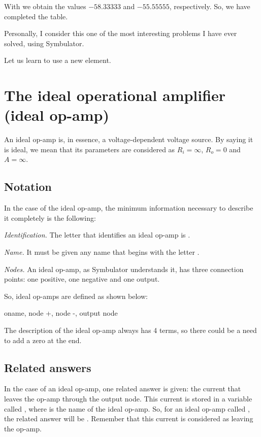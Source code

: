 With  we obtain the values $-58.33333$ and $-55.55555$,
respectively. So, we have completed the table.

Personally, I consider this one of the most interesting problems I
have ever solved, using Symbulator.

Let us learn to use a new element.

\section{The ideal operational amplifier (ideal op-amp)}

An ideal op-amp is, in essence, a voltage-dependent voltage source.
By saying it is ideal, we mean that its parameters are considered as
$R_i = \infty$, $R_o = 0$ and $A = \infty$.

\subsection{Notation}

In the case of the ideal op-amp, the minimum information necessary
to describe it completely is the following:

\emph{Identification.} The letter that identifies an ideal op-amp is
.

\emph{Name.} It must be given any name that begins with the letter
.

\emph{Nodes.} An ideal op-amp, as Symbulator understands it, has
three connection points: one positive, one negative and one output.

So, ideal op-amps are defined as shown below:

\begin{entry}
oname, node +, node -, output node
\end{entry}

The description of the ideal op-amp always has 4 terms, so there
could be a need to add a zero at the end.

\subsection{Related answers}

In the case of an ideal op-amp, one related answer is given: the
current that leaves the op-amp through the output node. This current
is stored in a variable called , where  is
the name of the ideal op-amp. So, for an ideal op-amp called
, the related answer will be . Remember that this
current is considered as leaving the op-amp.

